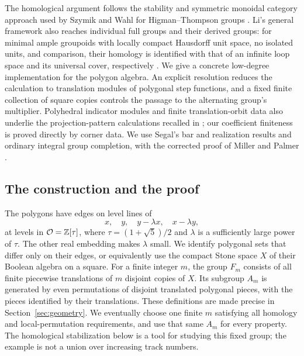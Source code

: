 The homological argument follows the stability and symmetric
monoidal category approach used by Szymik and Wahl for
Higman--Thompson groups \cite{SzymikWahl2019}. Li's general
framework also reaches individual full groups and their derived
groups: for minimal ample groupoids with locally compact Hausdorff
unit space, no isolated units, and comparison, their homology is
identified with that of an infinite loop space and its universal
cover, respectively \cite[Theorem~5.18 and Corollary~5.20]{Li2025}.
We give a concrete low-degree implementation for the polygon
algebra. An explicit resolution reduces the calculation to
translation modules of polygonal step functions, and a fixed
finite collection of square copies controls the passage to the alternating
group's multiplier. Polyhedral indicator modules and finite
translation-orbit data also underlie the projection-pattern
calculations recalled in
\cite[Section~3.1]{GahlerHuntonKellendonk2013}; our coefficient
finiteness is proved directly by corner data. We use
Segal's bar and realization results and
ordinary integral group completion, with the corrected proof of
Miller and Palmer
\cite{Segal1974,McDuffSegal1976,MillerPalmer2015}.

\subsection{The construction and the proof}

The polygons have edges on level lines of
\[
 x,\quad y,\quad y-\lambda x,\quad x-\lambda y,
\]
at levels in $\mathcal O=\mathbb Z[\tau]$, where $\tau=(1+\sqrt5)/2$ and
$\lambda$ is a sufficiently large power of $\tau$. The other real
embedding makes $\lambda$ small. We identify polygonal sets that
differ only on their edges, or equivalently use the compact Stone
space $X$ of their Boolean algebra on a square. For a finite
integer $m$, the group $F_m$ consists of all finite piecewise
translations of $m$ disjoint copies of $X$. Its subgroup $A_m$ is
generated by even permutations of disjoint translated polygonal
pieces, with the pieces identified by their translations.
These definitions are made precise in Section~\ref{sec:geometry}.
We eventually choose one finite $m$ satisfying all homology and
local-permutation requirements, and use that same $A_m$ for every
property.  The homological stabilization below is a tool for studying
this fixed group; the example is not a union over increasing track
numbers.

